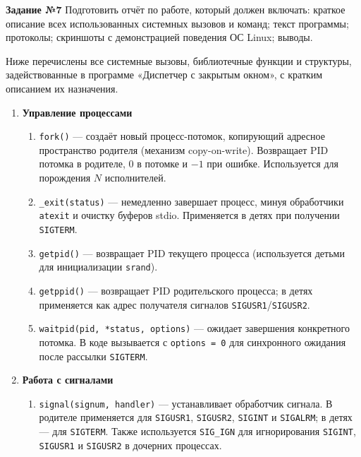 \textbf{Задание №7} Подготовить отчёт по работе, который должен включать: краткое описание всех использованных системных вызовов и команд; текст программы; протоколы; скриншоты с демонстрацией поведения ОС Linux; выводы. \label{sec:7}

    Ниже перечислены все системные вызовы, библиотечные функции и структуры, задействованные в программе «Диспетчер с закрытым окном», с кратким описанием их назначения.

    \begin{enumerate}

        \item \textbf{Управление процессами}

        \begin{enumerate}
            \item \texttt{fork()} — создаёт новый процесс-потомок, копирующий адресное пространство родителя (механизм copy-on-write). Возвращает PID потомка в родителе, $0$ в потомке и $-1$ при ошибке. Используется для порождения $N$ исполнителей.
            \item \texttt{\_exit(status)} — немедленно завершает процесс, минуя обработчики \texttt{atexit} и очистку буферов stdio. Применяется в детях при получении \texttt{SIGTERM}.
            \item \texttt{getpid()} — возвращает PID текущего процесса (используется детьми для инициализации \texttt{srand}).
            \item \texttt{getppid()} — возвращает PID родительского процесса; в детях применяется как адрес получателя сигналов \texttt{SIGUSR1}/\texttt{SIGUSR2}.
            \item \texttt{waitpid(pid, *status, options)} — ожидает завершения конкретного потомка. В коде вызывается с \texttt{options = 0} для синхронного ожидания после рассылки \texttt{SIGTERM}.
        \end{enumerate}

        \item \textbf{Работа с сигналами}

        \begin{enumerate}
            \item \texttt{signal(signum, handler)} — устанавливает обработчик сигнала. В родителе применяется для \texttt{SIGUSR1}, \texttt{SIGUSR2}, \texttt{SIGINT} и \texttt{SIGALRM}; в детях — для \texttt{SIGTERM}. Также используется \texttt{SIG\_IGN} для игнорирования \texttt{SIGINT}, \texttt{SIGUSR1} и \texttt{SIGUSR2} в дочерних процессах.


\end{enumerate}
\end{enumerate}
